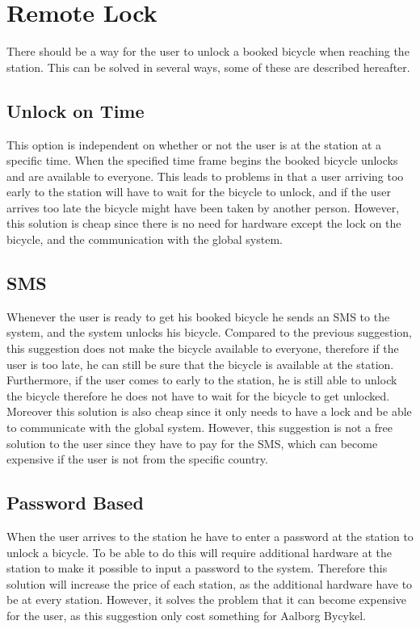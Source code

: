 \section{Remote Lock}\label{sec:remoteLock}
There should be a way for the user to unlock a booked bicycle when reaching the station.
This can be solved in several ways, some of these are described hereafter.

\subsection{Unlock on Time}
This option is independent on whether or not the user is at the station at a specific time.
When the specified time frame begins the booked bicycle unlocks and are available to everyone.
This leads to problems in that a user arriving too early to the station will have to wait for the bicycle to unlock, and if the user arrives too late the bicycle might have been taken by another person.
However, this solution is cheap since there is no need for hardware except the lock on the bicycle, and the communication with the global system.

\subsection{SMS}
Whenever the user is ready to get his booked bicycle he sends an SMS to the system, and the system unlocks his bicycle.
Compared to the previous suggestion, this suggestion does not make the bicycle available to everyone, therefore if the user is too late, he can still be sure that the bicycle is available at the station.
Furthermore, if the user comes to early to the station, he is still able to unlock the bicycle therefore he does not have to wait for the bicycle to get unlocked.
Moreover this solution is also cheap since it only needs to have a lock and be able to communicate with the global system.
However, this suggestion is not a free solution to the user since they have to pay for the SMS, which can become expensive if the user is not from the specific country.

\subsection{Password Based}
When the user arrives to the station he have to enter a password at the station to unlock a bicycle.
To be able to do this will require additional hardware at the station to make it possible to input a password to the system.
Therefore this solution will increase the price of each station, as the additional hardware have to be at every station.
However, it solves the problem that it can become expensive for the user, as this suggestion only cost something for Aalborg Bycykel.

